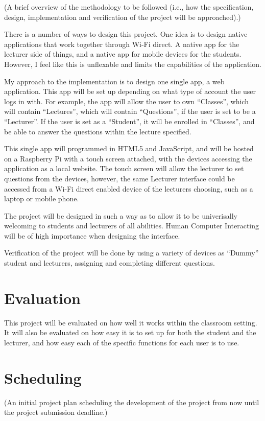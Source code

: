 \documentclass{article}
\begin{document}
(A brief overview of the methodology to be followed (i.e., how the specification, design, implementation and verification of the project will be approached).)

There is a number of ways to design this project. One idea is to design native applications that work together through Wi-Fi direct. A native app for the lecturer side of things, and a native app for mobile devices for the students. However, I feel like this is unflexable and limits the capabilities of the application. 

My approach to the implementation is to design one single app, a web application. This app will be set up depending on what type of account the user logs in with. For example, the app will allow the user to own ``Classes'', which will contain ``Lectures'', which will contain ``Questions'', if the user is set to be a ``Lecturer''. If the user is set as a ``Student'', it will be enrolled in ``Classes'', and be able to answer the questions within the lecture specified.

This single app will programmed in HTML5 and JavaScript, and will be hosted on a Raspberry Pi with a touch screen attached, with the devices accessing the application as a local website. The touch screen will allow the lecturer to set questions from the devices, however, the same Lecturer interface could be accessed from a Wi-Fi direct enabled device of the lecturers choosing, such as a laptop or mobile phone. 

The project will be designed in such a way as to allow it to be univerisally welcoming to students and lecturers of all abilities. Human Computer Interacting will be of high importance when designing the interface.

Verification of the project will be done by using a variety of devices as ``Dummy'' student and lecturers, assigning and completing different questions.

\section{Evaluation}
This project will be evaluated on how well it works within the classroom setting. It will also be evaluated on how easy it is to set up for both the student and the lecturer, and how easy each of the specific functions for each user is to use. 

\section{Scheduling}
(An initial project plan scheduling the development of the project from now until the project submission deadline.)
\end{document}
